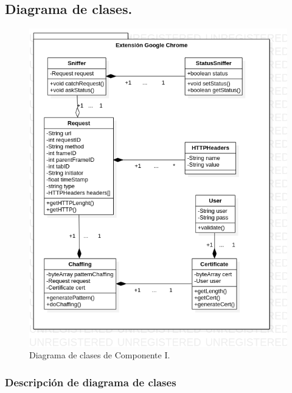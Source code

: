 \documentclass[12pt, a4paper, titlepage]{report}
\begin{document}
			\subsection{Diagrama de clases.}
			
    			\begin{figure}[H]
    				\begin{center}	\includegraphics[width=13cm]{./imagenes/Disenio/Componente_1/CI_DC_P1.png}
    				\caption{Diagrama de clases de Componente I.}
    				\end{center}
    			\end{figure}
			    
			    \newpage
			    \subsubsection{Descripción de diagrama de clases}
			    
\end{document}
